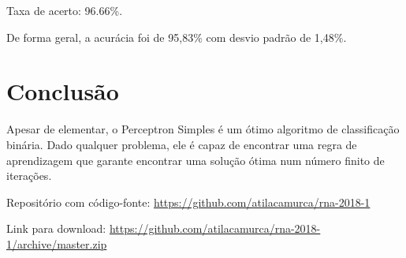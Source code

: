 Taxa de acerto: 96.66\%.

De forma geral, a acurácia foi de 95,83\% com desvio padrão de 1,48\%.

\section{Conclusão}

Apesar de elementar, o Perceptron Simples é um ótimo algoritmo de
classificação binária. Dado qualquer problema, ele é capaz de encontrar
uma regra de aprendizagem que garante encontrar uma solução ótima num
número finito de iterações.

Repositório com código-fonte:
\url{https://github.com/atilacamurca/rna-2018-1}

Link para download:
\url{https://github.com/atilacamurca/rna-2018-1/archive/master.zip}
